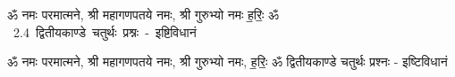 \documentclass[17pt]{extarticle}
\begin{document}
\begin{titlepage}
    \begin{center}
 
\begin{sanskrit}
    { \Large
    ॐ नमः परमात्मने, श्री महागणपतये नमः, श्री गुरुभ्यो नमः
ह॒रिः॒ ॐ 
    }
    \\
    \vspace{2.5cm}
    \mbox{ \Huge
    2.4      द्वितीयकाण्डे चतुर्थः प्रश्नः - इष्टिविधानं   }
\end{sanskrit}
\end{center}

\end{titlepage}
\tableofcontents

ॐ नमः परमात्मने, श्री महागणपतये नमः, 
श्री गुरुभ्यो नमः, ह॒रिः॒ ॐ       द्वितीयकाण्डे चतुर्थः प्रश्नः - इष्टिविधानं \newline

\end{document}

